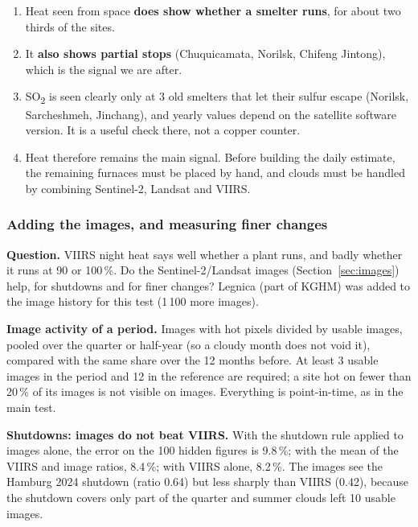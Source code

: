 \documentclass[10pt,a4paper]{article}
\newcommand{\SOtwo}{SO\textsubscript{2}}
\begin{document}
\begin{keybox}
\begin{enumerate}[leftmargin=1.4em]
  \item Heat seen from space \textbf{does show whether a smelter runs}, for about two thirds of the sites.
  \item It \textbf{also shows partial stops} (Chuquicamata, Norilsk, Chifeng Jintong), which is the signal we are after.
  \item \SOtwo{} is seen clearly only at 3 old smelters that let their sulfur escape (Norilsk, Sarcheshmeh, Jinchang), and yearly values depend on the satellite software version. It is a useful check there, not a copper counter.
  \item Heat therefore remains the main signal. Before building the daily estimate, the remaining furnaces must be placed by hand, and clouds must be handled by combining Sentinel-2, Landsat and VIIRS.
\end{enumerate}
\end{keybox}


\subsubsection*{Adding the images, and measuring finer changes}
\textbf{Question.} VIIRS night heat says well whether a plant runs, and badly whether it runs at 90 or 100\,\%. Do the Sentinel-2/Landsat images (Section~\ref{sec:images}) help, for shutdowns and for finer changes? Legnica (part of KGHM) was added to the image history for this test (1\,100 more images).

\textbf{Image activity of a period.} Images with hot pixels divided by usable images, pooled over the quarter or half-year (so a cloudy month does not void it), compared with the same share over the 12 months before. At least 3 usable images in the period and 12 in the reference are required; a site hot on fewer than 20\,\% of its images is not visible on images. Everything is point-in-time, as in the main test.

\textbf{Shutdowns: images do not beat VIIRS.} With the shutdown rule applied to images alone, the error on the 100 hidden figures is 9.8\,\%; with the mean of the VIIRS and image ratios, 8.4\,\%; with VIIRS alone, 8.2\,\%. The images see the Hamburg 2024 shutdown (ratio 0.64) but less sharply than VIIRS (0.42), because the shutdown covers only part of the quarter and summer clouds left 10 usable images.
\end{document}

